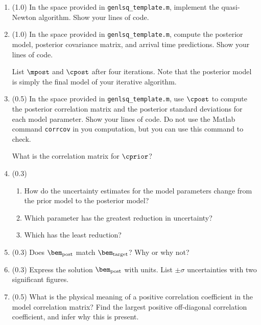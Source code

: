 \documentclass[11pt,titlepage,fleqn]{article}
\begin{document}
\begin{enumerate}
\item (1.0) In the space provided in \verb+genlsq_template.m+, implement the quasi-Newton algorithm. Show your lines of code.


\item (1.0) In the space provided in \verb+genlsq_template.m+, compute the posterior model, posterior covariance matrix, and arrival time predictions. Show your lines of code.

List $\mpost$ and $\cpost$ after four iterations. Note that the posterior model is simply the final model of your iterative algorithm.


\item (0.5) In the space provided in \verb+genlsq_template.m+, use $\cpost$ to compute the posterior correlation matrix and the posterior standard deviations for each model parameter. Show your lines of code. Do not use the Matlab command \verb+corrcov+ in you computation, but you can use this command to check.

What is the correlation matrix for $\cprior$?


\item (0.3)
\begin{enumerate}
\item How do the uncertainty estimates for the model parameters change from the prior model to the posterior model?
\item Which parameter has the greatest reduction in uncertainty?
\item Which has the least reduction?
\end{enumerate}


\item (0.3) Does $\bem_{\rm post}$ match $\bem_{\rm target}$? Why or why not?


\item (0.3) Express the solution $\bem_{\rm post}$ with units. List $\pm\sigma$ uncertainties with two significant figures.


\item (0.5) What is the physical meaning of a positive correlation coefficient in the model correlation matrix? Find the largest positive off-diagonal correlation coefficient, and infer why this is present.


\end{enumerate}
\end{document}
